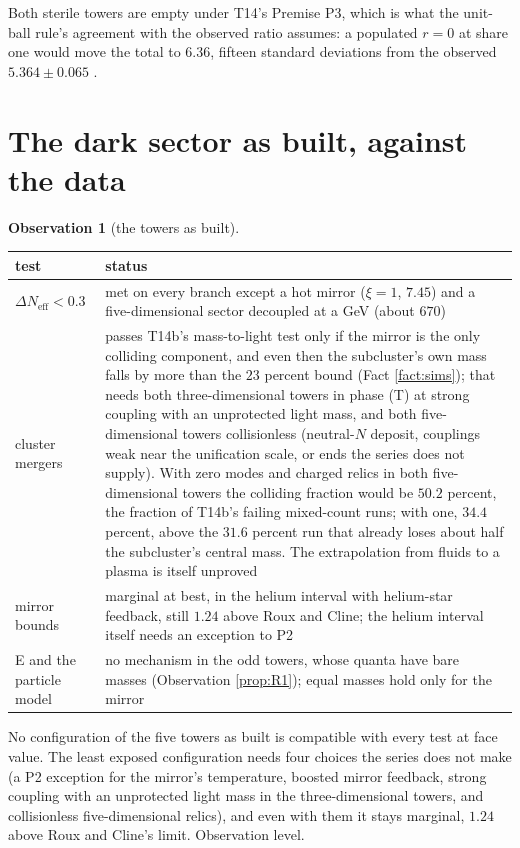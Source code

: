 \documentclass[11pt]{article}
\theoremstyle{definition}
\newtheorem{observation}[theorem]{Observation}
\newcommand{\Neff}{N_{\mathrm{eff}}}
\begin{document}
Both sterile towers are empty under T14's Premise P3, which is what the unit-ball rule's agreement with the observed ratio assumes: a populated $r = 0$ at share one would move the total to $6.36$, fifteen standard deviations from the observed $5.364 \pm 0.065$ \cite{Planck2018}.

\section{The dark sector as built, against the data}\label{sec:data}

\begin{observation}[the towers as built]\label{obs:data}
\begin{center}\small
\begin{tabular}{@{}p{3.6cm}p{10.2cm}@{}}
\toprule
test & status \\
\midrule
$\Delta\Neff < 0.3$ & met on every branch except a hot mirror ($\xi = 1$, $7.45$) and a five-dimensional sector decoupled at a GeV (about $670$) \\
cluster mergers & passes T14b's mass-to-light test only if the mirror is the only colliding component, and even then the subcluster's own mass falls by more than the $23$ percent bound (Fact \ref{fact:sims}); that needs both three-dimensional towers in phase (T) at strong coupling with an unprotected light mass, and both five-dimensional towers collisionless (neutral-$N$ deposit, couplings weak near the unification scale, or ends the series does not supply). With zero modes and charged relics in both five-dimensional towers the colliding fraction would be $50.2$ percent, the fraction of T14b's failing mixed-count runs; with one, $34.4$ percent, above the $31.6$ percent run that already loses about half the subcluster's central mass. The extrapolation from fluids to a plasma is itself unproved \\
mirror bounds & marginal at best, in the helium interval with helium-star feedback, still $1.24$ above Roux and Cline; the helium interval itself needs an exception to P2 \\
E and the particle model & no mechanism in the odd towers, whose quanta have bare masses (Observation \ref{prop:R1}); equal masses hold only for the mirror \\
\bottomrule
\end{tabular}
\end{center}
No configuration of the five towers as built is compatible with every test at face value. The least exposed configuration needs four choices the series does not make (a P2 exception for the mirror's temperature, boosted mirror feedback, strong coupling with an unprotected light mass in the three-dimensional towers, and collisionless five-dimensional relics), and even with them it stays marginal, $1.24$ above Roux and Cline's limit. Observation level.
\end{observation}
\end{document}

